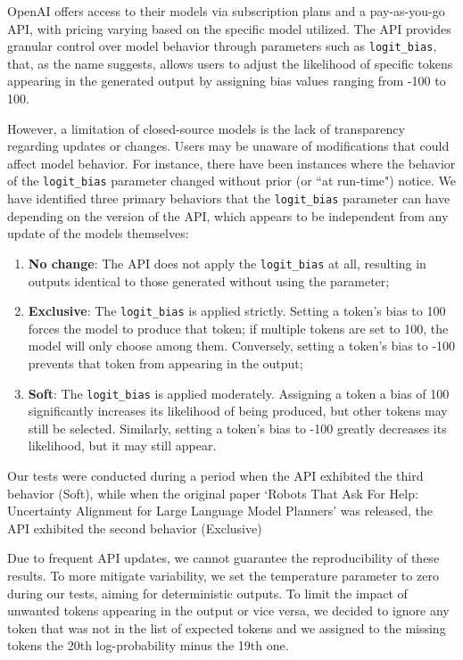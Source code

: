 OpenAI offers access to their models via subscription plans and a pay-as-you-go API,
with pricing varying based on the specific model utilized. The API provides granular
control over model behavior through parameters such as \texttt{logit\_bias}, that,
as the name suggests, allows users to adjust the likelihood of specific tokens appearing
in the generated output by assigning bias values ranging from -100 to 100.

However, a limitation of closed-source models is the lack of transparency
regarding updates or changes. Users may be unaware of modifications that could affect
model behavior. For instance, there have been instances where the behavior of the
\texttt{logit\_bias} parameter changed without prior (or ``at run-time") notice.
We have identified three primary behaviors that the \texttt{logit\_bias} parameter
can have depending on the version of the API, which appears to be independent
from any update of the models themselves:
\begin{enumerate}
  \item \textbf{No change}: The API does not apply the \texttt{logit\_bias} at
    all, resulting in outputs identical to those generated without using the parameter;

  \item \textbf{Exclusive}: The \texttt{logit\_bias} is applied strictly. Setting
    a token's bias to 100 forces the model to produce that token; if multiple
    tokens are set to 100, the model will only choose among them. Conversely, setting
    a token's bias to -100 prevents that token from appearing in the output;

  \item \textbf{Soft}: The \texttt{logit\_bias} is applied moderately. Assigning
    a token a bias of 100 significantly increases its likelihood of being produced,
    but other tokens may still be selected. Similarly, setting a token's bias to
    -100 greatly decreases its likelihood, but it may still appear.
\end{enumerate}

Our tests were conducted during a period when the API exhibited the third
behavior (Soft), while when the original paper `Robots That Ask For Help: Uncertainty
Alignment for Large Language Model Planners' was released, the API exhibited the
second behavior (Exclusive)

Due to frequent API updates, we cannot guarantee the reproducibility of these results.
To more mitigate variability, we set the temperature parameter to zero during our
tests, aiming for deterministic outputs. To limit the impact of unwanted tokens appearing
in the output or vice versa, we decided to ignore any token that was not in the
list of expected tokens and we assigned to the missing tokens the 20th log-probability
minus the 19th one.

